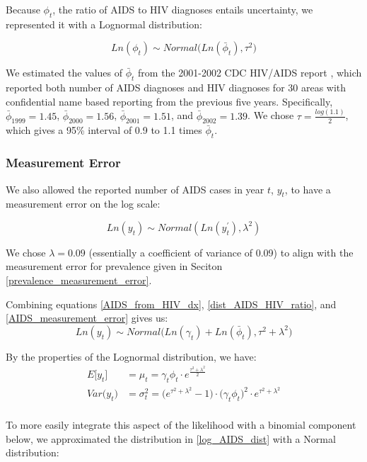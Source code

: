 \documentclass{article}
\begin{document}
Because $\phi_t$, the ratio of AIDS to HIV diagnoses entails uncertainty, we represented it with a Lognormal distribution:

\begin{equation} \label{dist_AIDS_HIV_ratio}
	Ln(\phi_t) \sim Normal\big(Ln(\bar{\phi}_t), \tau^2)
\end{equation}

We estimated the values of $\bar{\phi}_t$ from the 2001-2002 CDC HIV/AIDS report \cite{cdc14}, which reported both number of AIDS diagnoses and HIV diagnoses for 30 areas with confidential name based reporting from the previous five years. Specifically, $\bar{\phi}_{1999}=1.45$, $\bar{\phi}_{2000}=1.56$, $\bar{\phi}_{2001}=1.51$, and $\bar{\phi}_{2002}=1.39$. We chose $\tau = \frac{log(1.1)}{2}$, which gives a 95\% interval of 0.9 to 1.1 times $\bar{\phi}_t$.

\subsubsection{Measurement Error}
We also allowed the reported number of AIDS cases in year $t$, $y_t$, to have a measurement error on the log scale:

\begin{equation} \label{AIDS_measurement_error}
	Ln(y_t) \sim Normal(Ln(y^\prime_t), \lambda^2)
\end{equation}

We chose $\lambda = 0.09$ (essentially a coefficient of variance of 0.09) to align with the measurement error for prevalence given in Seciton \ref{prevalence_measurement_error}.

Combining equations \ref{AIDS_from_HIV_dx}, \ref{dist_AIDS_HIV_ratio}, and \ref{AIDS_measurement_error} gives us:
\begin{equation} \label{log_AIDS_dist}
	Ln(y_t) \sim Normal\big(Ln(\gamma_t) + Ln(\bar{\phi}_t), \tau^2 + \lambda^2\big)
\end{equation}

By the properties of the Lognormal distribution, we have:
\begin{align}
	E\big[y_t\big] &= \mu_t = \gamma_t \phi_t \cdot e^{\frac{\tau^2 + \lambda^2}{2}}\\
	Var\big(y_t\big) &= \sigma^2_t = \big(e^{\tau^2 + \lambda^2} -1\big) \cdot \big(\gamma_t \phi_t\big)^2 \cdot e^{\tau^2 + \lambda^2}\\
\end{align}

To more easily integrate this aspect of the likelihood with a binomial component below, we approximated the distribution in \ref{log_AIDS_dist} with a Normal distribution:
\end{document}
